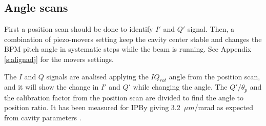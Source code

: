 \subsection{Angle scans}
First a position scan should be done to identify $I'$ and $Q'$ signal. Then, a combination of piezo-movers setting keep the cavity center stable and changes the BPM pitch angle in systematic steps while the beam is running. See Appendix \ref{s:alignadj} for the movers settings.\par
The $I$ and $Q$ signals are analised applying the $IQ_{rot}$ angle from the position scan, and it will show the change in $I'$ and $Q'$ while changing the angle. The $Q'/\theta_p$ and the calibration factor from the position scan are divided to find the angle to position ratio. It has been measured for IPBy giving 3.2~$\mu m$/mrad as expected from cavity parameters \cite{Neven2014}.\par
